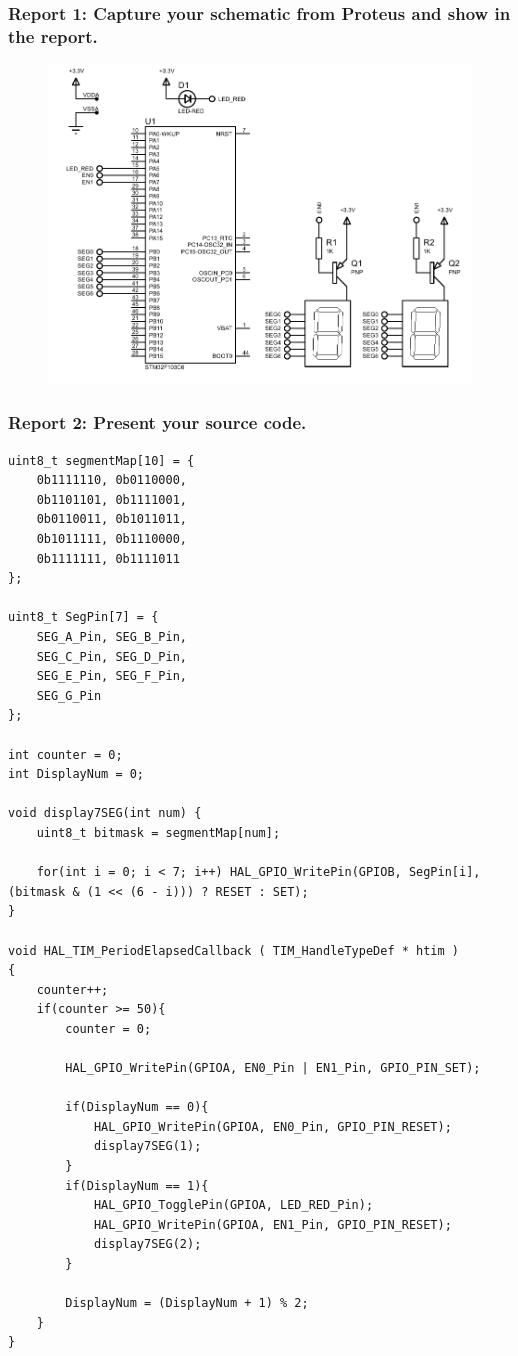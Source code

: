 \documentclass[a4paper,12pt]{article}
\begin{document}
\subsubsection{Report 1: Capture your schematic from Proteus and show in the report.}
\label{ex1r1}
\begin{figure}[H]
    \centering
    \includegraphics[width=0.95\linewidth]{Attachments/1.1.1.PDF}
\end{figure}
\subsubsection{Report 2: Present your source code.}
\begin{lstlisting}
uint8_t segmentMap[10] = {
	0b1111110, 0b0110000,
	0b1101101, 0b1111001,
	0b0110011, 0b1011011,
	0b1011111, 0b1110000,
	0b1111111, 0b1111011
};

uint8_t SegPin[7] = {
	SEG_A_Pin, SEG_B_Pin,
	SEG_C_Pin, SEG_D_Pin,
	SEG_E_Pin, SEG_F_Pin,
	SEG_G_Pin
};

int counter = 0;
int DisplayNum = 0;

void display7SEG(int num) {
	uint8_t bitmask = segmentMap[num];
	
	for(int i = 0; i < 7; i++) HAL_GPIO_WritePin(GPIOB, SegPin[i], (bitmask & (1 << (6 - i))) ? RESET : SET);
}

void HAL_TIM_PeriodElapsedCallback ( TIM_HandleTypeDef * htim )
{
	counter++;
	if(counter >= 50){
		counter = 0;
		
		HAL_GPIO_WritePin(GPIOA, EN0_Pin | EN1_Pin, GPIO_PIN_SET);
		
		if(DisplayNum == 0){
			HAL_GPIO_WritePin(GPIOA, EN0_Pin, GPIO_PIN_RESET);
			display7SEG(1);
		}
		if(DisplayNum == 1){
			HAL_GPIO_TogglePin(GPIOA, LED_RED_Pin);
			HAL_GPIO_WritePin(GPIOA, EN1_Pin, GPIO_PIN_RESET);
			display7SEG(2);
		}
		
		DisplayNum = (DisplayNum + 1) % 2;
	}
}
\end{lstlisting}
\end{document}

